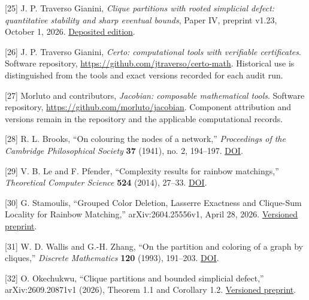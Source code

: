 \documentclass[english,11pt,a4paper]{article}
\begin{document}
{[}25{]} J. P. Traverso Gianini, \emph{Clique partitions with rooted
simplicial defect: quantitative stability and sharp eventual bounds},
Paper IV, preprint v1.23, October 1, 2026.
\href{https://doi.org/10.5281/zenodo.23089131}{Deposited edition}.

{[}26{]} J. P. Traverso Gianini, \emph{Certo: computational tools with
verifiable certificates}. Software repository,
\url{https://github.com/jtraverso/certo-math}. Historical use is
distinguished from the tools and exact versions recorded for each audit
run.

{[}27{]} Morluto and contributors, \emph{Jacobian: composable
mathematical tools}. Software repository,
\url{https://github.com/morluto/jacobian}. Component attribution and
versions remain in the repository and the applicable computational
records.

{[}28{]} R. L. Brooks, ``On colouring the nodes of a network,''
\emph{Proceedings of the Cambridge Philosophical Society} \textbf{37}
(1941), no. 2, 194--197.
\href{https://doi.org/10.1017/S030500410002168X}{DOI}.

{[}29{]} V. B. Le and F. Pfender, ``Complexity results for rainbow
matchings,'' \emph{Theoretical Computer Science} \textbf{524} (2014),
27--33. \href{https://doi.org/10.1016/j.tcs.2013.12.013}{DOI}.

{[}30{]} G. Stamoulis, ``Grouped Color Deletion, Lasserre Exactness and
Clique-Sum Locality for Rainbow Matching,'' arXiv:2604.25556v1, April
28, 2026. \href{https://arxiv.org/abs/2604.25556v1}{Versioned preprint}.

{[}31{]} W. D. Wallis and G.-H. Zhang, ``On the partition and coloring
of a graph by cliques,'' \emph{Discrete Mathematics} \textbf{120}
(1993), 191--203.
\href{https://doi.org/10.1016/0012-365X(93)90576-F}{DOI}.

{[}32{]} O. Okechukwu, ``Clique partitions and bounded simplicial
defect,'' arXiv:2609.20871v1 (2026), Theorem 1.1 and Corollary 1.2.
\href{https://arxiv.org/abs/2609.20871v1}{Versioned preprint}.

\endgroup
\end{document}
